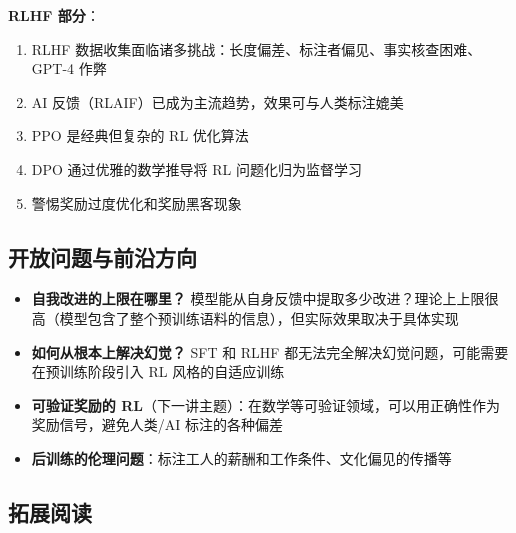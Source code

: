 \documentclass[a4paper]{article}
\begin{document}
\textbf{RLHF 部分}：
\begin{enumerate}
    \item RLHF 数据收集面临诸多挑战：长度偏差、标注者偏见、事实核查困难、GPT-4 作弊
    \item AI 反馈（RLAIF）已成为主流趋势，效果可与人类标注媲美
    \item PPO 是经典但复杂的 RL 优化算法
    \item DPO 通过优雅的数学推导将 RL 问题化归为监督学习
    \item 警惕奖励过度优化和奖励黑客现象
\end{enumerate}

\subsection{开放问题与前沿方向}

\begin{itemize}
    \item \textbf{自我改进的上限在哪里？} 模型能从自身反馈中提取多少改进？理论上上限很高（模型包含了整个预训练语料的信息），但实际效果取决于具体实现
    \item \textbf{如何从根本上解决幻觉？} SFT 和 RLHF 都无法完全解决幻觉问题，可能需要在预训练阶段引入 RL 风格的自适应训练
    \item \textbf{可验证奖励的 RL}（下一讲主题）：在数学等可验证领域，可以用正确性作为奖励信号，避免人类/AI 标注的各种偏差
    \item \textbf{后训练的伦理问题}：标注工人的薪酬和工作条件、文化偏见的传播等
\end{itemize}

\subsection{拓展阅读}
\end{document}
